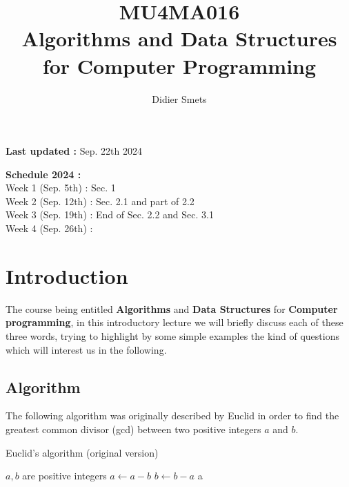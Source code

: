 \documentclass[12pt]{article}
\title{MU4MA016\\Algorithms and Data Structures\\for Computer Programming}
\author{Didier Smets}
\date{}
\theoremstyle{plain}
\theoremstyle{remark}
\begin{document}
\maketitle

\noindent 
{\bf Last updated :} Sep. 22th 2024

\medskip

\noindent
{\bf Schedule 2024 :}\\
Week 1 (Sep. 5th)  : Sec. 1\\
Week 2 (Sep. 12th) : Sec. 2.1 and part of 2.2\\
Week 3 (Sep. 19th) : End of Sec. 2.2 and Sec. 3.1\\
Week 4 (Sep. 26th) : 

\tableofcontents

\pagebreak

\section{Introduction}

The course being entitled {\bf Algorithms} and {\bf Data Structures} for {\bf
Computer programming}, in this introductory lecture we will briefly discuss each 
of these three words, trying to highlight by some simple examples the kind of
questions which will interest us in the following.

\subsection{Algorithm}

The following algorithm was originally described by Euclid in order to find
the greatest common divisor (gcd) between two positive integers $a$ and $b$.

\begin{algorithm}[H]
\caption{Euclid's algorithm (original version)}
\begin{algorithmic}
\Require $a, b$ are positive integers
\State $a \gets a - b$
\Else{}
\State $b \gets b - a$
\EndIf
\EndWhile
\State \Return a
\EndFunction
\end{algorithmic}
\end{algorithm}
\end{document}
